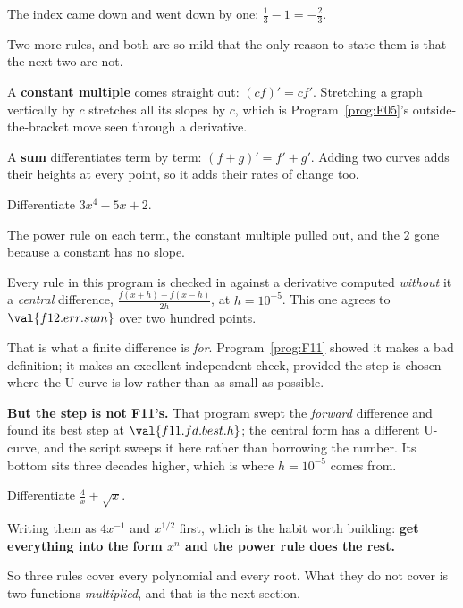 \begin{fr}
The index came down and went down by one: $\frac{1}{3} - 1 = -\frac{2}{3}$.

Two more rules, and both are so mild that the only reason to state them is
that the next two are not.

A \textbf{constant multiple} comes straight out: $(cf)' = c f'$. Stretching a
graph vertically by $c$ stretches all its slopes by $c$, which is
Program~\ref{prog:F05}'s outside-the-bracket move seen through a derivative.

A \textbf{sum} differentiates term by term: $(f + g)' = f' + g'$. Adding two
curves adds their heights at every point, so it adds their rates of change
too.

Differentiate $3x^{4} - 5x + 2$.
\nextframe
\end{fr}

\begin{fr}
The power rule on each term, the constant multiple pulled out, and the $2$
gone because a constant has no slope.

\begin{note}
Every rule in this program is checked in
 against a derivative computed \emph{without}
it \dash{} a \emph{central} difference, $\frac{f(x+h) - f(x-h)}{2h}$, at
$h = 10^{-5}$. This one agrees to $\val{f12.err.sum}$ over two hundred points.

That is what a finite difference is \emph{for}. Program~\ref{prog:F11} showed
it makes a bad definition; it makes an excellent independent check, provided
the step is chosen where the U-curve is low rather than as small as possible.

\textbf{But the step is not F11's.} That program swept the \emph{forward}
difference and found its best step at $\val{f11.fd.best.h}$; the central form
has a different U-curve, and the script sweeps it here rather than borrowing
the number. Its bottom sits three decades higher, which is where
$h = 10^{-5}$ comes from.
\end{note}

Differentiate $\frac{4}{x} + \sqrt{x}$.
\nextframe
\end{fr}

\begin{fr}
Writing them as $4x^{-1}$ and $x^{1/2}$ first, which is the habit worth
building: \textbf{get everything into the form $x^{n}$ and the power rule does
the rest.}

So three rules cover every polynomial and every root. What they do not cover
is two functions \emph{multiplied}, and that is the next section.
\end{fr}

